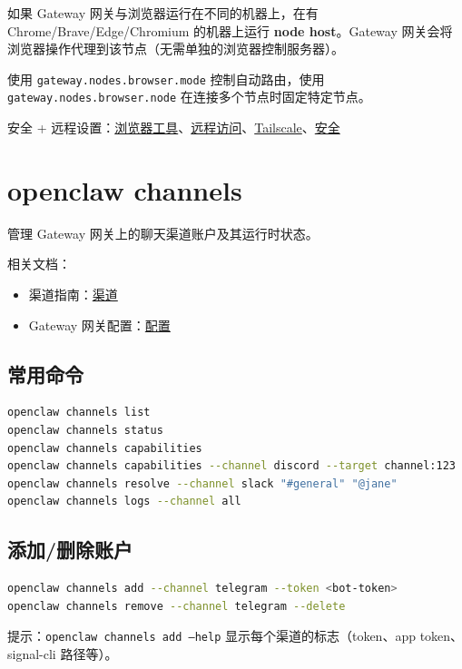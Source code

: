 如果 Gateway 网关与浏览器运行在不同的机器上，在有 Chrome/Brave/Edge/Chromium 的机器上运行 \textbf{node host}。Gateway 网关会将浏览器操作代理到该节点（无需单独的浏览器控制服务器）。

使用 \texttt{gateway.nodes.browser.mode} 控制自动路由，使用 \texttt{gateway.nodes.browser.node} 在连接多个节点时固定特定节点。

安全 + 远程设置：\href{/tools/browser}{浏览器工具}、\href{/gateway/remote}{远程访问}、\href{/gateway/tailscale}{Tailscale}、\href{/gateway/security}{安全}


\clearpage

\section{openclaw channels}


管理 Gateway 网关上的聊天渠道账户及其运行时状态。

相关文档：

\begin{itemize}
  \item 渠道指南：\href{/channels/index}{渠道}
  \item Gateway 网关配置：\href{/gateway/configuration}{配置}
\end{itemize}


\subsection{常用命令}


\begin{lstlisting}[language=bash]
openclaw channels list
openclaw channels status
openclaw channels capabilities
openclaw channels capabilities --channel discord --target channel:123
openclaw channels resolve --channel slack "#general" "@jane"
openclaw channels logs --channel all
\end{lstlisting}


\subsection{添加/删除账户}


\begin{lstlisting}[language=bash]
openclaw channels add --channel telegram --token <bot-token>
openclaw channels remove --channel telegram --delete
\end{lstlisting}


提示：\texttt{openclaw channels add --help} 显示每个渠道的标志（token、app token、signal-cli 路径等）。

